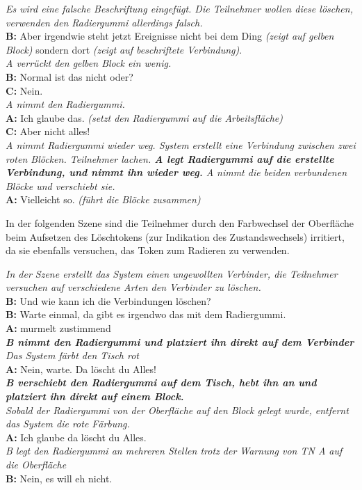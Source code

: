 \begin{transkript}
	\emph{Es wird eine falsche Beschriftung eingefügt. Die Teilnehmer wollen diese löschen, verwenden den Radiergummi allerdings falsch.}\\
	\textbf{B:} Aber irgendwie steht jetzt Ereignisse nicht bei dem Ding \emph{(zeigt auf gelben Block)} sondern dort \emph{(zeigt auf beschriftete Verbindung)}.\\
	\emph{A verrückt den gelben Block ein wenig.}\\
	\textbf{B:} Normal ist das nicht oder?\\
	\textbf{C:} Nein.\\
	\emph{A nimmt den Radiergummi.}\\
	\textbf{A:} Ich glaube das. \emph{(setzt den Radiergummi auf die Arbeitsfläche)}\\
	\textbf{C:} Aber nicht alles!\\
	\emph{A nimmt Radiergummi wieder weg. System erstellt eine Verbindung zwischen zwei roten Blöcken. Teilnehmer lachen. \textbf{A legt Radiergummi auf die erstellte Verbindung, und nimmt ihn wieder weg.} A nimmt die beiden verbundenen Blöcke und verschiebt sie.}\\
	\textbf{A:} Vielleicht so. \emph{(führt die Blöcke zusammen)}
\end{transkript}

In der folgenden Szene sind die Teilnehmer durch den Farbwechsel der Oberfläche beim Aufsetzen des Löschtokens (zur Indikation des Zustandswechsels) irritiert, da sie ebenfalls versuchen, das Token zum Radieren zu verwenden.

\begin{transkript}
	\emph{In der Szene erstellt das System einen ungewollten Verbinder, die Teilnehmer versuchen auf verschiedene Arten den Verbinder zu löschen.}\\
	\textbf{B:} Und wie kann ich die Verbindungen löschen?\\
	\textbf{B:} Warte einmal, da gibt es irgendwo das mit dem Radiergummi.\\
	\textbf{A:} murmelt zustimmend \\
	\emph{\textbf{B nimmt den Radiergummi und platziert ihn direkt auf dem Verbinder}}\\
	\emph{Das System färbt den Tisch rot}\\
	\textbf{A:} Nein, warte. Da löscht du Alles!\\
	\emph{\textbf{B verschiebt den Radiergummi auf dem Tisch, hebt ihn an und platziert ihn direkt auf einem Block.}}\\
	\emph{Sobald der Radiergummi von der Oberfläche auf den Block gelegt wurde, entfernt das System die rote Färbung.}\\
	\textbf{A:} Ich glaube da löscht du Alles.\\
	\emph{B legt den Radiergummi an mehreren Stellen trotz der Warnung von TN A auf die Oberfläche}\\
	\textbf{B:} Nein, es will eh nicht.\\
\end{transkript}

